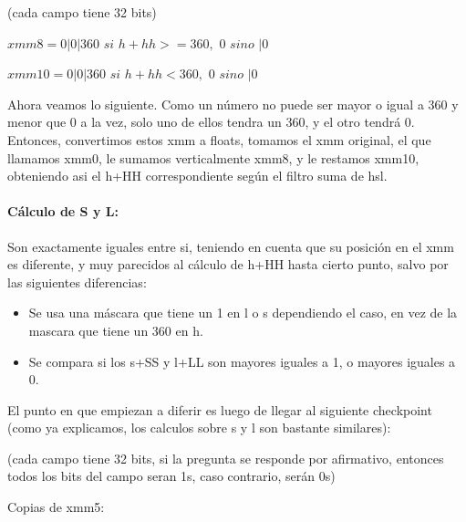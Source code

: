 \documentclass[a4paper]{article}
\begin{document}
\vspace*{0.3cm}

(cada campo tiene 32 bits)

\vspace*{0.3cm}

$xmm8= 0 | 0 | 360$ $si$ $h+hh>=360,$ $0$ $sino$ $| 0$

\vspace*{0.3cm}

$xmm10=0 | 0 | 360$ $si$ $h+hh<360,$ $0$ $sino$ $| 0$

\vspace*{0.3cm}

Ahora veamos lo siguiente. Como un número no puede ser mayor o igual a 360 y menor que 0 a la vez, solo uno de ellos tendra un 360, y el otro tendrá 0. Entonces, convertimos estos xmm a floats, tomamos el xmm original, el que llamamos xmm0, le sumamos verticalmente xmm8, y le restamos xmm10, obteniendo asi el h+HH correspondiente según el filtro suma de hsl.

\paragraph*{Cálculo de S y L:}

Son exactamente iguales entre si, teniendo en cuenta que su posición en el xmm es diferente, y muy parecidos al cálculo de h+HH hasta cierto punto, salvo por las siguientes diferencias:

\begin{itemize}
	\item Se usa una máscara que tiene un 1 en l o s dependiendo el caso, en vez de la mascara que tiene un 360 en h.
	\item Se compara si los s+SS y l+LL son mayores iguales a 1, o mayores iguales a 0.
\end{itemize}

El punto en que empiezan a diferir es luego de llegar al siguiente checkpoint (como ya explicamos, los calculos sobre s y l son bastante similares):

\vspace*{0.3cm}

(cada campo tiene 32 bits, si la pregunta se responde por afirmativo, entonces todos los bits del campo seran 1s, caso contrario, serán 0s)

\vspace*{0.3cm}

Copias de xmm5:

\vspace*{0.3cm}
\end{document}

